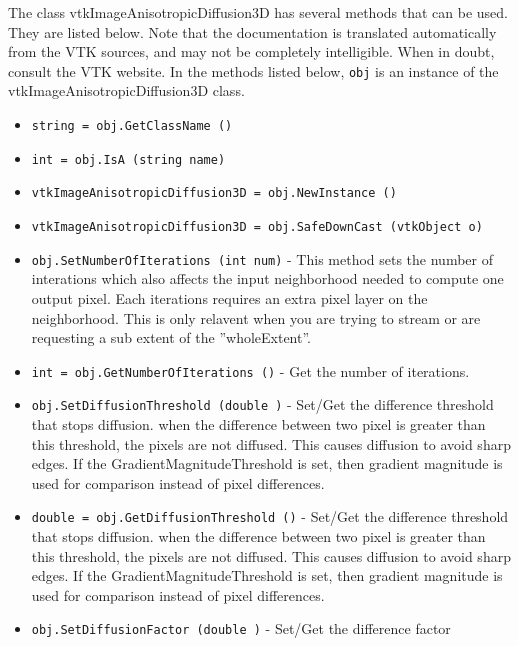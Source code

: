 The class vtkImageAnisotropicDiffusion3D has several methods that can be used.
  They are listed below.
Note that the documentation is translated automatically from the VTK sources,
and may not be completely intelligible.  When in doubt, consult the VTK website.
In the methods listed below, \verb|obj| is an instance of the vtkImageAnisotropicDiffusion3D class.
\begin{itemize}
\item  \verb|string = obj.GetClassName ()|

\item  \verb|int = obj.IsA (string name)|

\item  \verb|vtkImageAnisotropicDiffusion3D = obj.NewInstance ()|

\item  \verb|vtkImageAnisotropicDiffusion3D = obj.SafeDownCast (vtkObject o)|

\item  \verb|obj.SetNumberOfIterations (int num)| -  This method sets the number of interations which also affects the
 input neighborhood needed to compute one output pixel.  Each iterations
 requires an extra pixel layer on the neighborhood.  This is only relavent
 when you are trying to stream or are requesting a sub extent of the ''wholeExtent''.

\item  \verb|int = obj.GetNumberOfIterations ()| -  Get the number of iterations.

\item  \verb|obj.SetDiffusionThreshold (double )| -  Set/Get the difference threshold that stops diffusion. 
 when the difference between two pixel is greater than this threshold,
 the pixels are not diffused.  This causes diffusion to avoid sharp edges.
 If the GradientMagnitudeThreshold is set, then gradient magnitude is used 
 for comparison instead of pixel differences.

\item  \verb|double = obj.GetDiffusionThreshold ()| -  Set/Get the difference threshold that stops diffusion. 
 when the difference between two pixel is greater than this threshold,
 the pixels are not diffused.  This causes diffusion to avoid sharp edges.
 If the GradientMagnitudeThreshold is set, then gradient magnitude is used 
 for comparison instead of pixel differences.

\item  \verb|obj.SetDiffusionFactor (double )| -  Set/Get the difference factor


\end{itemize}
